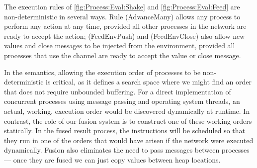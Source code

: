 The execution rules of \cref{fig:Process:Eval:Shake} and \cref{fig:Process:Eval:Feed} are non-deterministic in several ways.
Rule (AdvanceMany) allows any process to perform any action at any time, provided all other processes in the network are ready to accept the action; (FeedEnvPush) and (FeedEnvClose) also allow new values and close messages to be injected from the environment, provided all processes that use the channel are ready to accept the value or close message.

In the semantics, allowing the execution order of processes to be non-deterministic is critical, as it defines a search space where we might find an order that does not require unbounded buffering.
For a direct implementation of concurrent processes using message passing and operating system threads, an actual, working, execution order would be discovered dynamically at runtime.
In contrast, the role of our fusion system is to construct one of these working orders statically.
In the fused result process, the instructions will be scheduled so that they run in one of the orders that would have arisen if the network were executed dynamically.
Fusion also eliminates the need to pass messages between processes --- once they are fused we can just copy values between heap locations.

